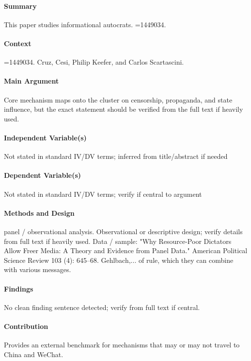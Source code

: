 \documentclass[12pt]{article}
\begin{document}
\paragraph{Summary} This paper studies informational autocrats. =1449034.

\paragraph{Context} =1449034. Cruz, Cesi, Philip Keefer, and Carlos Scartascini.

\paragraph{Main Argument} Core mechanism maps onto the cluster on censorship, propaganda, and state influence, but the exact statement should be verified from the full text if heavily used.

\paragraph{Independent Variable(s)} Not stated in standard IV/DV terms; inferred from title/abstract if needed

\paragraph{Dependent Variable(s)} Not stated in standard IV/DV terms; verify if central to argument

\paragraph{Methods and Design} panel / observational analysis. Observational or descriptive design; verify details from full text if heavily used. Data / sample: "Why Resource-Poor Dictators Allow Freer Media: A Theory and Evidence from Panel Data." American Political Science Review 103 (4): 645--68. Gehlbach,... of rule, which they can combine with various messages.

\paragraph{Findings} No clean finding sentence detected; verify from full text if central.

\paragraph{Contribution} Provides an external benchmark for mechanisms that may or may not travel to China and WeChat.
\end{document}
